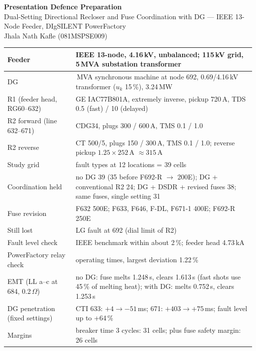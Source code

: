 \documentclass[11pt,a4paper]{article}
\newcommand{\sect}[1]{\bigskip{\Large\color{navy}\bfseries #1}\par\smallskip{\color{navy}\hrule height 0.8pt}\smallskip}
\begin{document}
\begin{center}
{\LARGE\bfseries\color{navy} Presentation Defence Preparation}\\[4pt]
{\large Dual-Setting Directional Recloser and Fuse Coordination with DG --- IEEE 13-Node Feeder, DIgSILENT PowerFactory}\\[2pt]
Jhala Nath Kafle (081MSPSE009)
\end{center}

\sect{1. Numbers to Remember}
\begin{tabular}{|>{\raggedright}p{6.3cm}|>{\raggedright\arraybackslash}p{9.6cm}|}
\hline
Feeder & IEEE 13-node, 4.16\,kV, unbalanced; 115\,kV grid, 5\,MVA substation transformer \\ \hline
DG & 4.05\,MVA synchronous machine at node 692, 0.69/4.16\,kV transformer ($u_k$ 15\,\%), 3.24\,MW \\ \hline
R1 (feeder head, RG60--632) & GE IAC77B801A, extremely inverse, pickup 720\,A, TDS 0.5 (fast) / 10 (delayed) \\ \hline
R2 forward (line 632--671) & CDG34, plugs 300 / 600\,A, TMS 0.1 / 1.0 \\ \hline
R2 reverse & CT 500/5, plugs 150 / 300\,A, TMS 0.1 / 1.0; reverse pickup $1.25\times252$\,A $\approx 315$\,A \\ \hline
Study grid & 4 fault types at 12 locations = 39 cells \\ \hline
Coordination held & no DG 39 (35 before F692-R $\rightarrow$ 200E); DG + conventional R2 24; DG + DSDR + revised fuses 38; same fuses, single setting 31 \\ \hline
Fuse revision & F632 500E; F633, F646, F-DL, F671-1 400E; F692-R 250E \\ \hline
Still lost & LG fault at 692 (dial limit of R2) \\ \hline
Fault level check & IEEE benchmark within about 2\,\%; feeder head 4.73\,kA \\ \hline
PowerFactory relay check & 1896 operating times, largest deviation 1.22\,\% \\ \hline
EMT (LL a--c at 684, 0.2\,$\Omega$) & no DG: fuse melts 1.248\,s, clears 1.613\,s (fast shots use 45\,\% of melting heat); with DG: melts 0.752\,s, clears 1.253\,s \\ \hline
DG penetration (fixed settings) & CTI 633: $+4 \rightarrow -51$\,ms; 671: $+403 \rightarrow +75$\,ms; fault level up to +64\,\% \\ \hline
Margins & breaker time 3 cycles: 31 cells; plus fuse safety margin: 26 cells \\ \hline
\end{tabular}
\end{document}
